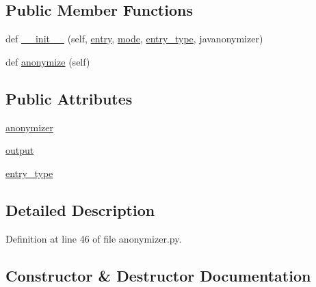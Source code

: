 \subsection*{Public Member Functions}
\begin{DoxyCompactItemize}
\item 
def \hyperlink{classparlai_1_1utils_1_1anonymizer_1_1FullAnonymizer_ac58c9de377c9f79ada18d88657da4f09}{\+\_\+\+\_\+init\+\_\+\+\_\+} (self, \hyperlink{classparlai_1_1utils_1_1anonymizer_1_1Anonymizer_a348d1fd062fa3f57ad81cce32e8dd2c7}{entry}, \hyperlink{classparlai_1_1utils_1_1anonymizer_1_1Anonymizer_a535b959cd821885d5af2831644cde735}{mode}, \hyperlink{classparlai_1_1utils_1_1anonymizer_1_1FullAnonymizer_a95080b7f5bd386981a082671431df555}{entry\+\_\+type}, javanonymizer)
\item 
def \hyperlink{classparlai_1_1utils_1_1anonymizer_1_1FullAnonymizer_a52bb75b8a8406fd69f3fec4134bab054}{anonymize} (self)
\end{DoxyCompactItemize}
\subsection*{Public Attributes}
\begin{DoxyCompactItemize}
\item 
\hyperlink{classparlai_1_1utils_1_1anonymizer_1_1FullAnonymizer_a70fcdf554f74a86b63ef8950241f813e}{anonymizer}
\item 
\hyperlink{classparlai_1_1utils_1_1anonymizer_1_1FullAnonymizer_acf1b1219e757e42e5389a7dee4486c30}{output}
\item 
\hyperlink{classparlai_1_1utils_1_1anonymizer_1_1FullAnonymizer_a95080b7f5bd386981a082671431df555}{entry\+\_\+type}
\end{DoxyCompactItemize}


\subsection{Detailed Description}


Definition at line 46 of file anonymizer.\+py.



\subsection{Constructor \& Destructor Documentation}
\mbox{\label{classparlai_1_1utils_1_1anonymizer_1_1FullAnonymizer_ac58c9de377c9f79ada18d88657da4f09}} 
